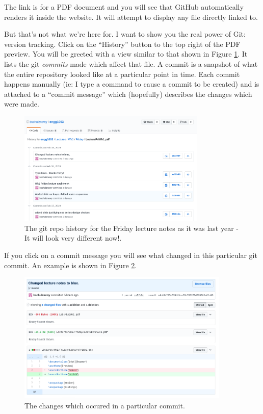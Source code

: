 \documentclass{lab}
\begin{document}
The link is for a PDF document and you will see that GitHub automatically renders it inside the website. It will attempt to display any file directly linked to.

But that's not what we're here for. I want to show you the real power of Git: version tracking. Click on the ``History'' button to the top right of the PDF preview. You will be greeted with a view similar to that shown in Figure \ref{fig:githistory}. It lists the git \textit{commits} made which affect that file. A commit is a snapshot of what the entire repository looked like at a particular point in time. Each commit happens manually (ie: I type a command to cause a commit to be created) and is attached to a ``commit message'' which (hopefully) describes the changes which were made.

\begin{figure}[H]
\begin{center}
\includegraphics[width=0.8\textwidth]{Wk1Images/github_lecture.png}
\end{center}
\caption{The git repo history for the Friday lecture notes as it was last year - It will look very different now!.}\label{fig:githistory}
\end{figure}

If you click on a commit message you will see what changed in this particular git commit. An example is shown in Figure \ref{fig:gitchanges}.

\begin{figure}[H]
\begin{center}
\includegraphics[width=0.9\textwidth]{Wk1Images/github_lecture_changes.png}
\end{center}
\caption{The changes which occured in a particular commit.}\label{fig:gitchanges}
\end{figure}
\end{document}
